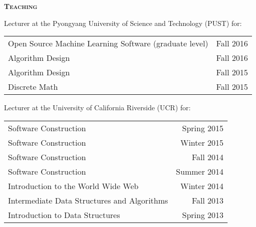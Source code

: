 \documentclass[12pt]{article}
\begin{document}
%
%
%



\vspace{0.15in}
\noindent
{{\scshape \bfseries {Teaching}}}
\vspace{0.05in}


\noindent
Lecturer at the Pyongyang University of Science and Technology (PUST) for:

\noindent
\begin{tabularx}{\textwidth}{Xr}
Open Source Machine Learning Software (graduate level)& Fall 2016 \\
Algorithm Design & Fall 2016 \\
Algorithm Design & Fall 2015 \\
Discrete Math & Fall 2015
\end{tabularx}

\vspace{0.1in}
\noindent
Lecturer at the University of California Riverside (UCR) for:

\noindent
\begin{tabularx}{\textwidth}{Xr}
Software Construction & Spring 2015 \\
Software Construction & Winter 2015                        \\
Software Construction & Fall 2014 \\
Software Construction & Summer 2014 \\
Introduction to the World Wide Web & Winter 2014 \\
Intermediate Data Structures and Algorithms & Fall 2013 \\
Introduction to Data Structures & Spring 2013 \\
\end{tabularx}
\end{document}
